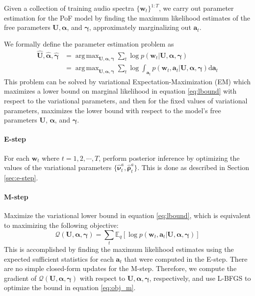 \documentclass{article} %
\DeclareMathOperator*{\argmax}{arg\,max}
\begin{document}
Given a collection of training audio spectra $\{\bm{w}_t\}^{1:T}$, we carry out parameter estimation for the PoF model by finding the maximum likelihood estimates of the free parameters $\mathbf{U}, \bm{\alpha}$, and $\bm{\gamma}$, approximately marginalizing out $\bm{a}_t$.

We formally define the parameter estimation problem as
\begin{align} \label{eq:obj}
\hat{\mathbf{U}}, \hat{\bm{\alpha}}, \hat{\bm{\gamma}} &= \argmax_{\mathbf{U}, \bm{\alpha}, \bm{\gamma}} \sum_t \log p(\bm{w}_t | \mathbf{U}, \bm{\alpha}, \bm{\gamma}) \\ 
&= \argmax_{\mathbf{U}, \bm{\alpha}, \bm{\gamma}} \sum_t \log \int_{\bm{a}_t} p(\bm{w}_t, \bm{a}_t | \mathbf{U}, \bm{\alpha}, \bm{\gamma}) \mathrm{d} \bm{a}_t \nonumber
\end{align}
This problem can be solved by variational Expectation-Maximization (EM) which maximizes a lower bound on marginal likelihood in equation \ref{eq:lbound} with respect to the variational parameters, and then for the fixed values of variational parameters, maximizes the lower bound with respect to the model's free parameters $\mathbf{U}$, $\bm{\alpha}$, and $\bm{\gamma}$. 

\paragraph{E-step} For each $\bm{w}_t$ where $t = 1, 2, \cdots, T$, perform posterior inference by optimizing the values of the variational parameters $\{\hat{\bm{\nu}}_t^{a}, \hat{\bm{\rho}}_t^{a}\}$. This is done as described in Section \ref{sec:e-step}.

\paragraph{M-step}
Maximize the variational lower bound in equation \ref{eq:lbound}, which is equivalent to maximizing the following objective: 
\begin{equation} \label{eq:obj_m}
\mathcal{Q}(\mathbf{U}, \bm{\alpha}, \bm{\gamma}) = \textstyle{\sum_t} \mathbb{E}_q [ \log p(\bm{w}_t, \bm{a}_t | \mathbf{U}, \bm{\alpha}, \bm{\gamma}) ] 
\end{equation}
This is accomplished by finding the maximum likelihood estimates using
the expected sufficient statistics for each $\bm{a}_t$ that were
computed in the E-step. There are no simple closed-form updates for the
M-step. Therefore, we compute the gradient of $\mathcal{Q}(\mathbf{U},
\bm{\alpha}, \bm{\gamma})$ with respect to $\mathbf{U}, \bm{\alpha},
\bm{\gamma}$, respectively, and use L-BFGS to optimize the bound in
equation \ref{eq:obj_m}.
\end{document}
